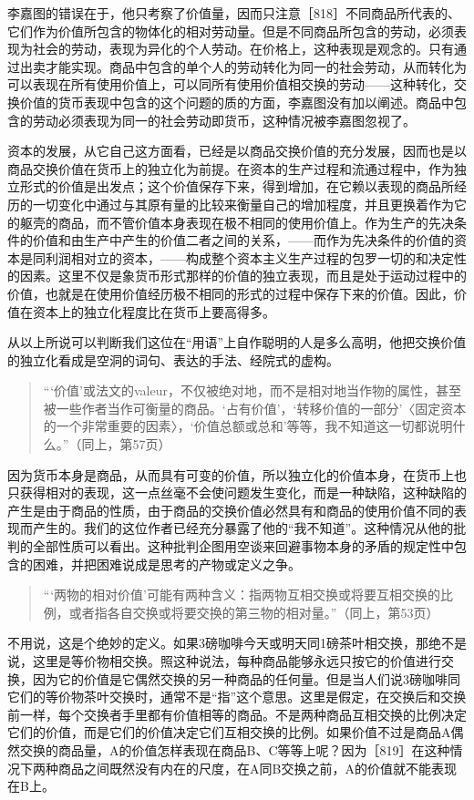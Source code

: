 李嘉图的错误在于，他只考察了价值量，因而只注意［818］不同商品所代表的、它们作为价值所包含的物体化的相对劳动量。但是不同商品所包含的劳动，必须表现为社会的劳动，表现为异化的个人劳动。在价格上，这种表现是观念的。只有通过出卖才能实现。商品中包含的单个人的劳动转化为同一的社会劳动，从而转化为可以表现在所有使用价值上，可以同所有使用价值相交换的劳动——这种转化，交换价值的货币表现中包含的这个问题的质的方面，李嘉图没有加以阐述。商品中包含的劳动必须表现为同一的社会劳动即货币，这种情况被李嘉图忽视了。

资本的发展，从它自己这方面看，已经是以商品交换价值的充分发展，因而也是以商品交换价值在货币上的独立化为前提。在资本的生产过程和流通过程中，作为独立形式的价值是出发点；这个价值保存下来，得到增加，在它赖以表现的商品所经历的一切变化中通过与其原有量的比较来衡量自己的增加程度，并且更换着作为它的躯壳的商品，而不管价值本身表现在极不相同的使用价值上。作为生产的先决条件的价值和由生产中产生的价值二者之间的关系，——而作为先决条件的价值的资本是同利润相对立的资本，——构成整个资本主义生产过程的包罗一切的和决定性的因素。这里不仅是象货币形式那样的价值的独立表现，而且是处于运动过程中的价值，也就是在使用价值经历极不相同的形式的过程中保存下来的价值。因此，价值在资本上的独立化程度比在货币上要高得多。

从以上所说可以判断我们这位在“用语”上自作聪明的人是多么高明，他把交换价值的独立化看成是空洞的词句、表达的手法、经院式的虚构。

\begin{quote}{“‘价值’或法文的valeur，不仅被绝对地，而不是相对地当作物的属性，甚至被一些作者当作可衡量的商品。‘占有价值’，‘转移价值的一部分’〈固定资本的一个非常重要的因素〉，‘价值总额或总和’等等，我不知道这一切都说明什么。”（同上，第57页）}\end{quote}

因为货币本身是商品，从而具有可变的价值，所以独立化的价值本身，在货币上也只获得相对的表现，这一点丝毫不会使问题发生变化，而是一种缺陷，这种缺陷的产生是由于商品的性质，由于商品的交换价值必然具有和商品的使用价值不同的表现而产生的。我们的这位作者已经充分暴露了他的“我不知道”。这种情况从他的批判的全部性质可以看出。这种批判企图用空谈来回避事物本身的矛盾的规定性中包含的困难，并把困难说成是思考的产物或定义之争。

\begin{quote}{“‘两物的相对价值’可能有两种含义：指两物互相交换或将要互相交换的比例，或者指各自交换或将要交换的第三物的相对量。”（同上，第53页）}\end{quote}

不用说，这是个绝妙的定义。如果3磅咖啡今天或明天同1磅茶叶相交换，那绝不是说，这里是等价物相交换。照这种说法，每种商品能够永远只按它的价值进行交换，因为它的价值是它偶然交换的另一种商品的任何量。但是当人们说3磅咖啡同它们的等价物茶叶交换时，通常不是“指”这个意思。这里是假定，在交换后和交换前一样，每个交换者手里都有价值相等的商品。不是两种商品互相交换的比例决定它们的价值，而是它们的价值决定它们互相交换的比例。如果价值不过是商品A偶然交换的商品量，A的价值怎样表现在商品B、C等等上呢？因为［819］在这种情况下两种商品之间既然没有内在的尺度，在A同B交换之前，A的价值就不能表现在B上。

